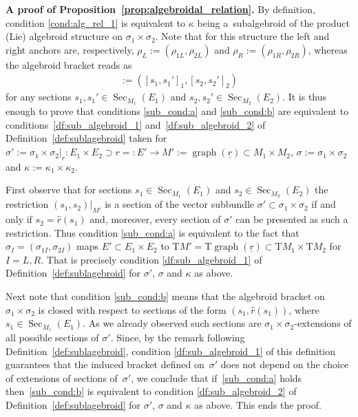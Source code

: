 \documentclass[pdftex]{sigma}
\newcommand{\wh}[1]{\widehat{#1}} %
\newcommand{\und}{\underline}
\newcommand{\graf}{\operatorname{graph}}
\newcommand{\Sec}{\operatorname{Sec}}
\newcommand{\ra}{\rightarrow}
\newcommand{\rhoL}{\rho_L} %
\newcommand{\rhoR}{\rho_R}
\newcommand{\T}{\mathrm{T}} %
\numberwithin{equation}{section}
\theoremstyle{definition}
\begin{document}
{\bf A proof of Proposition~\ref{prop:algebroidal_relation}.} %
By definition{,} condition \eqref{cond:alg_rel_1} is equivalent to $\kappa$ being a~subalgebroid of the product (Lie) algebroid structure on $\sigma_1\times\sigma_2$. Note that for this structure the left and right anchors are, respectively, $\rhoL:=(\rho_{1L},\rho_{2L})$ and $\rhoR:= (\rho_{1R},\rho_{2R})$, whereas the algebroid bracket reads as
\begin{gather*}[(s_1,s_2),(s_1',s_2')]:=([s_1,s_1']_1,[s_2,s_2']_2)\end{gather*}
for any sections $s_1,s_1'\in\Sec_{M_1}(E_1)$ and $s_2,s_2'\in\Sec_{M_2}(E_2)$. It is thus enough to prove that conditions \eqref{sub_cond:a} and \eqref{sub_cond:b} are equivalent to conditions~\eqref{df:sub_algebroid_1} and~\eqref{df:sub_algebroid_2} of Definition~\ref{def:sublagebroid} taken for $\sigma':=\sigma_1\times\sigma_2|_r\colon E_1\times E_2\supset r=:E'\ra M':=\graf(\und{r})\subset M_1\times M_2$, $\sigma:=\sigma_1\times \sigma_2$ and $\kappa:=\kappa_1\times\kappa_2$.

First observe that for sections $s_1\in \Sec_{M_1}(E_1)$ and $s_2\in \Sec_{M_2}(E_2)$ the restriction $(s_1, s_2)|_{M'}$ is a section of the vector subbundle $\sigma'\subset \sigma_1\times \sigma_2$ if and only if $s_2=\hat{r}(s_1)$ and, moreover, every section of $\sigma'$ can be presented as such a restriction. Thus condition \eqref{sub_cond:a} is equivalent to the fact that $\sigma_I=(\sigma_{1I},\sigma_{2I})$ maps $E'\subset E_1\times E_2$ to $\T M'=\T\graf(\und{r})\subset\T M_1\times \T M_2$ for $I=L,R$. That is precisely condition \eqref{df:sub_algebroid_1} of Definition~\ref{def:sublagebroid} for $\sigma'$, $\sigma$ and $\kappa$ as above.

Next note that condition \eqref{sub_cond:b} means that the algebroid bracket on $\sigma_1\times\sigma_2$ is closed with respect to sections of the form $(s_1,\wh{r}(s_1))$, where $s_1\in\Sec_{M_1}(E_1)$. As we already observed such sections are $\sigma_1\times\sigma_2$-extensions of all possible sections of $\sigma'$. Since, by the remark following Definition~\ref{def:sublagebroid}, condition \eqref{df:sub_algebroid_1} of this definition guarantees that the induced bracket defined on~$\sigma'$ does not depend on the choice of extensions of sections of~$\sigma'$, we conclude that if~\eqref{sub_cond:a} holds then~\eqref{sub_cond:b} is equivalent to condition \eqref{df:sub_algebroid_2} of Definition~\ref{def:sublagebroid} for $\sigma'$, $\sigma$ and $\kappa$ as above. This ends the proof. %
\end{document}
